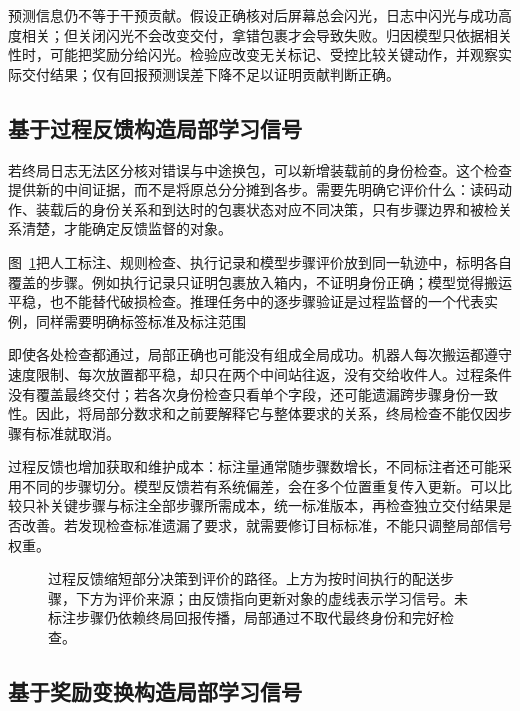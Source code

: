 预测信息仍不等于干预贡献。假设正确核对后屏幕总会闪光，日志中闪光与成功高度相关；但关闭闪光不会改变交付，拿错包裹才会导致失败。归因模型只依据相关性时，可能把奖励分给闪光。检验应改变无关标记、受控比较关键动作，并观察实际交付结果；仅有回报预测误差下降不足以证明贡献判断正确。

\subsection{基于过程反馈构造局部学习信号}
\label{sec:rl-reward-process}

若终局日志无法区分核对错误与中途换包，可以新增装载前的身份检查。这个检查提供新的中间证据，而不是将原总分分摊到各步。需要先明确它评价什么：读码动作、装载后的身份关系和到达时的包裹状态对应不同决策，只有步骤边界和被检关系清楚，才能确定反馈监督的对象。

图~\ref{fig:rl-reward-process}把人工标注、规则检查、执行记录和模型步骤评价放到同一轨迹中，标明各自覆盖的步骤。例如执行记录只证明包裹放入箱内，不证明身份正确；模型觉得搬运平稳，也不能替代破损检查。推理任务中的逐步骤验证是过程监督的一个代表实例，同样需要明确标签标准及标注范围

即使各处检查都通过，局部正确也可能没有组成全局成功。机器人每次搬运都遵守速度限制、每次放置都平稳，却只在两个中间站往返，没有交给收件人。过程条件没有覆盖最终交付；若各次身份检查只看单个字段，还可能遗漏跨步骤身份一致性。因此，将局部分数求和之前要解释它与整体要求的关系，终局检查不能仅因步骤有标准就取消。

过程反馈也增加获取和维护成本：标注量通常随步骤数增长，不同标注者还可能采用不同的步骤切分。模型反馈若有系统偏差，会在多个位置重复传入更新。可以比较只补关键步骤与标注全部步骤所需成本，统一标准版本，再检查独立交付结果是否改善。若发现检查标准遗漏了要求，就需要修订目标标准，不能只调整局部信号权重。

\begin{figure}[htbp]
  \centering
  
  \caption{过程反馈缩短部分决策到评价的路径。上方为按时间执行的配送步骤，下方为评价来源；由反馈指向更新对象的虚线表示学习信号。未标注步骤仍依赖终局回报传播，局部通过不取代最终身份和完好检查。}
  \label{fig:rl-reward-process}
\end{figure}

\subsection{基于奖励变换构造局部学习信号}
\label{sec:rl-reward-shaping}

